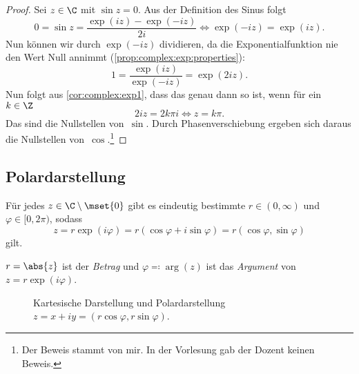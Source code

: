 \documentclass[a4paper]{article}
\begin{document}
\begin{proof}
    Sei $z \in \C$ mit $\sin z = 0$. Aus der Definition des Sinus folgt
    \begin{equation*}
        0 = \sin z = \frac{\exp(iz)-\exp(-iz)}{2i} \iff \exp(-iz) = \exp(iz).
    \end{equation*}
    Nun können wir durch $\exp(-iz)$ dividieren, da die Exponentialfunktion nie den Wert Null annimmt (\cref{prop:complex:exp:properties}):
    \begin{equation*}
        1 = \frac{\exp(iz)}{\exp(-iz)} = \exp(2iz).
    \end{equation*}
    Nun folgt aus \cref{cor:complex:exp1}, dass das genau dann so ist, wenn für ein~$k \in \Z$
    \begin{equation*}
        2iz = 2k\pi i \iff z = k\pi.
    \end{equation*}
    Das sind die Nullstellen von~$\sin$. Durch Phasenverschiebung ergeben sich daraus die Nullstellen von~$\cos$.\footnote{Der Beweis stammt von mir. In der Vorlesung gab der Dozent keinen Beweis.}
\end{proof}

\subsection{Polardarstellung}

\begin{proposition}
    Für jedes $z \in \C\setminus\mset{0}$ gibt es eindeutig bestimmte $r \in (0,\infty)$ und~$\varphi \in [0, 2\pi)$, sodass
    \begin{equation*}
        z = r\exp(i\varphi) = r (\cos\varphi + i\sin\varphi) = r(\cos\varphi,\sin\varphi)
    \end{equation*}
    gilt.
\end{proposition}

\begin{notation}
    $r = \abs{z}$ ist der \emph{Betrag} und $\varphi \eqqcolon \arg(z)$ ist das \emph{Argument} von~$z = r\exp(i\varphi)$.
\end{notation}

\begin{figure}
    \caption{Kartesische Darstellung und Polardarstellung $z = x+iy = (r\cos\varphi,r\sin\varphi)$.}
\end{figure}
\end{document}
